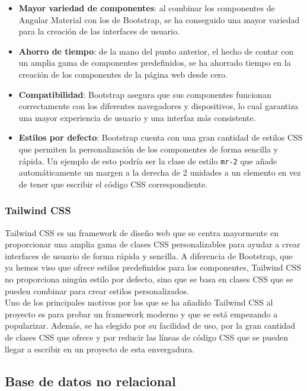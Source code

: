 \begin{itemize}
    \item \textbf{Mayor variedad de componentes}: al combinar los componentes de Angular Material con los de Bootstrap,
    se ha conseguido una mayor variedad para la creación de las interfaces de usuario.
    \item \textbf{Ahorro de tiempo}: de la mano del punto anterior, el hecho de contar con un amplia gama de componentes predefinidos,
    se ha ahorrado tiempo en la creación de los componentes de la página web desde cero.
    \item \textbf{Compatibilidad}: Bootstrap asegura que sus componentes funcionan correctamente con los diferentes
    navegadores y dispositivos, lo cual garantiza una mayor experiencia de usuario y una interfaz más consistente.
    \item \textbf{Estilos por defecto}: Bootstrap cuenta con una gran cantidad de estilos CSS que permiten la personalización
    de los componentes de forma sencilla y rápida. Un ejemplo de esto podría ser la clase de estilo \texttt{mr-2} que
    añade automáticamente un margen a la derecha de 2 unidades a un elemento en vez de tener que escribir el código CSS correspondiente.
\end{itemize}

\subsubsection{Tailwind CSS}\label{subsubsec:tailwind-css}

Tailwind CSS es un framework de diseño web que se centra mayormente en proporcionar una amplia gama de clases CSS
personalizables para ayudar a crear interfaces de usuario de forma rápida y sencilla. A diferencia de Bootstrap, que
ya hemos viso que ofrece estilos predefinidos para los componentes, Tailwind CSS no proporciona ningún estilo por defecto,
sino que se basa en clases CSS que se pueden combinar para crear estilos personalizados. \\

Uno de los principales motivos por los que se ha añadido Tailwind CSS al proyecto es para probar un framework
moderno y que se está empezando a popularizar. Además, se ha elegido por su facilidad de uso, por la gran cantidad
de clases CSS que ofrece y por reducir las líneas de código CSS que se pueden llegar a escribir en un proyecto de
esta envergadura.

\subsection{Base de datos no relacional}\label{subsec:base-de-datos-no-relacional}


